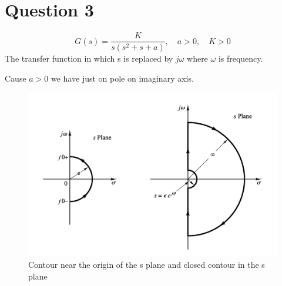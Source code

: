 \section{Question 3}
\begin{equation}
	G(s) = \dfrac{K}{s(s^2 + s + a)}, \quad a > 0, \quad K > 0
\end{equation}
The transfer function in which s is replaced by $j\omega$ where $\omega$ is frequency.

Cause $a>0$ we have just on pole on imaginary axis.
\begin{figure}[H]
	\caption{Contour near the origin of the s plane and closed contour in the s plane}
	\centering
	\includegraphics[width=12cm]{../Figure/Q2/nyquist_s_plane.png}
\end{figure}
